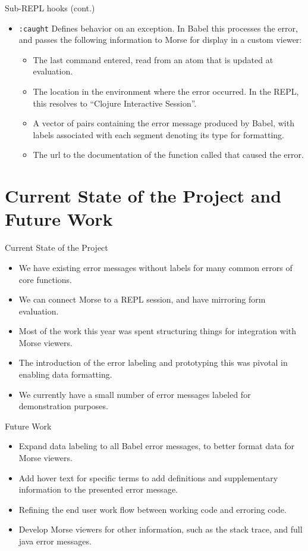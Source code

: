 \documentclass{beamer}
\begin{document}
\begin{frame}{Sub-REPL hooks (cont.)}
  \begin{itemize}
  \item<1-> \texttt{:caught} Defines behavior on an exception. In Babel this processes the error, and passes the following information to Morse for display in a custom viewer:
  \begin{itemize}
    \item<2-> The last command entered, read from an atom that is updated at evaluation.
    \item<3-> The location in the environment where the error occurred. In the REPL, this
    resolves to “Clojure Interactive Session”.
    \item<4-> A vector of pairs containing the error message produced by Babel, with labels associated with each segment denoting its type for formatting.
    \item<5-> The url to the documentation of the function called that caused the error.
  \end{itemize}
\end{itemize}
\end{frame}

\section{Current State of the Project and Future Work}
\begin{frame}{Current State of the Project}
  \begin{itemize}
    \item<1-> We have existing error messages without labels for many common errors of core functions.
    \item<2-> We can connect Morse to a REPL session, and have mirroring form evaluation.
    \item<3-> Most of the work this year was spent structuring things for integration with Morse viewers.
    \item<4-> The introduction of the error labeling and prototyping this was pivotal in enabling data formatting.
    \item<5-> We currently have a small number of error messages labeled for demonstration purposes.
  \end{itemize}
\end{frame}

\begin{frame}{Future Work}
  \begin{itemize}
    \item<1-> Expand data labeling to all Babel error messages, to better format data for Morse viewers.
    \item<2-> Add hover text for specific terms to add definitions and supplementary information to the presented error message.
    \item<3-> Refining the end user work flow between working code and erroring code.
    \item<4-> Develop Morse viewers for other information, such as the stack trace, and full java error messages.
  \end{itemize}
  \end{frame}
\end{document}
